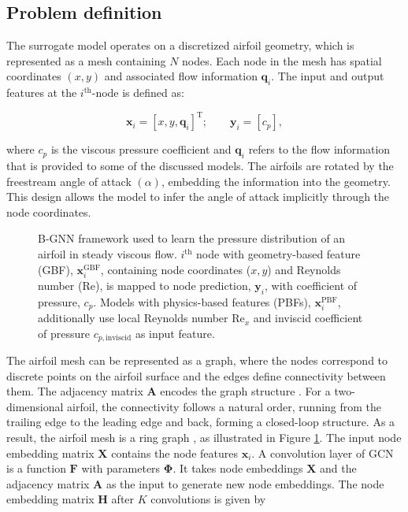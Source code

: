 \documentclass{marine_2025_paper_template}
\begin{document}
\subsection{Problem definition}


The surrogate model operates on a discretized airfoil geometry, which is represented as a mesh containing $N$ nodes. Each node in the mesh has spatial coordinates $(x,y)$ and associated flow information $\mathbf{q}_i$. The input and output features at the $i^{\text{th}}$-node is defined as:

\begin{equation}
    \mathbf{x}_i = [x,y,\mathbf{q}_i]^\mathrm{T} ; \qquad \mathbf{y}_i = [c_p] ,
\end{equation}

\noindent
where $c_p$ is the viscous pressure coefficient and $\mathbf{q}_i$ refers to the flow information that is provided to some of the discussed models. The airfoils are rotated by the freestream angle of attack $(\alpha)$, embedding the information into the geometry. This design allows the model to infer the angle of attack implicitly through the node coordinates. \newline

\begin{figure}[t]
    \centering
    
    \vspace{-0.8cm}
    \caption{B-GNN framework used to learn the pressure distribution of an airfoil in steady viscous flow. $i^{\text{th}}$ node with geometry-based feature (GBF), $\mathbf{x}^{\mathrm{GBF}}_i$, containing node coordinates ($x,y$) and Reynolds number ($\mathrm{Re}$), is mapped to node prediction, $\mathbf{y}_i$, with coefficient of pressure, $c_p$. Models with physics-based features (PBFs), $\mathbf{x}^{\mathrm{PBF}}_i$, additionally use local Reynolds number $\mathrm{Re}_x$ and inviscid coefficient of pressure $c_{p,\text{inviscid}}$ as input feature.}
    \label{fig:airfoil_gnn}
\end{figure}

\noindent The airfoil mesh can be represented as a graph, where the nodes correspond to discrete points on the airfoil surface and the edges define connectivity between them. The adjacency matrix $\mathbf{A}$ encodes the graph structure \citep{bronstein2021}. For a two-dimensional airfoil, the connectivity follows a natural order, running from the trailing edge to the leading edge and back, forming a closed-loop structure. As a result, the airfoil mesh is a ring graph \citep{bronstein2021}, as illustrated in Figure \ref{fig:airfoil_gnn}.
The input node embedding matrix \( \mathbf{X} \) contains the node features $\mathbf{x}_i$. A convolution layer of GCN is a function $\mathbf{F}$ with parameters $\mathbf{\Phi}$. It takes node embeddings \( \mathbf{X} \) and the adjacency matrix \( \mathbf{A} \) as the input to generate new node embeddings. The node embedding matrix $\mathbf{H}$ after $K$ convolutions is given by
\end{document}

